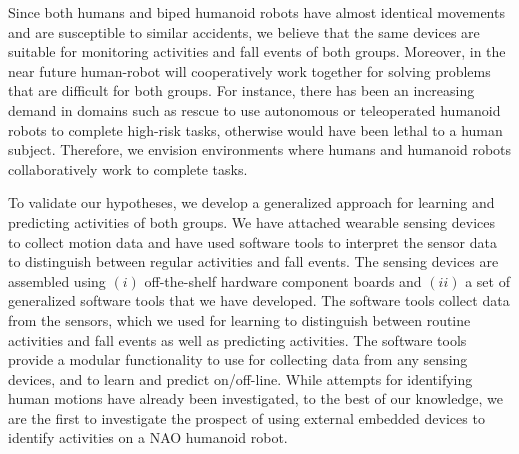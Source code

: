 \documentclass{IEEEtran}
\begin{document}

\par
Since both humans and biped humanoid robots have almost identical movements and are susceptible to 
similar accidents, we believe that the same devices are suitable for monitoring activities and fall events of both 
groups. Moreover, in the near future human-robot will cooperatively work together for solving problems that are difficult for both groups.  For instance, there has been an increasing demand in 
domains such as rescue to use autonomous or teleoperated humanoid robots to complete high-risk 
tasks, otherwise would have been lethal to a human subject. Therefore, we envision environments 
where humans and humanoid robots collaboratively work to complete tasks. 

\par


To validate our hypotheses, we develop a generalized approach for learning 
and predicting activities of both groups.  We have attached wearable sensing devices to collect 
motion data and have used software tools to interpret the sensor data to distinguish 
between regular activities and fall events. The sensing devices are assembled using $(i)$ off-the-shelf 
hardware component boards and $(ii)$  a set of generalized software tools that we have developed. The software tools 
collect data  from the sensors, which we used for learning to distinguish between routine activities and fall events as well as predicting activities. The software tools provide a modular 
functionality to use for collecting  data from any sensing devices, and to learn and predict 
on/off-line. While attempts for identifying human motions have already been investigated, to the 
best of our knowledge, we are the first to investigate the prospect of using external embedded 
devices to identify activities on a NAO humanoid robot. 
\end{document}
